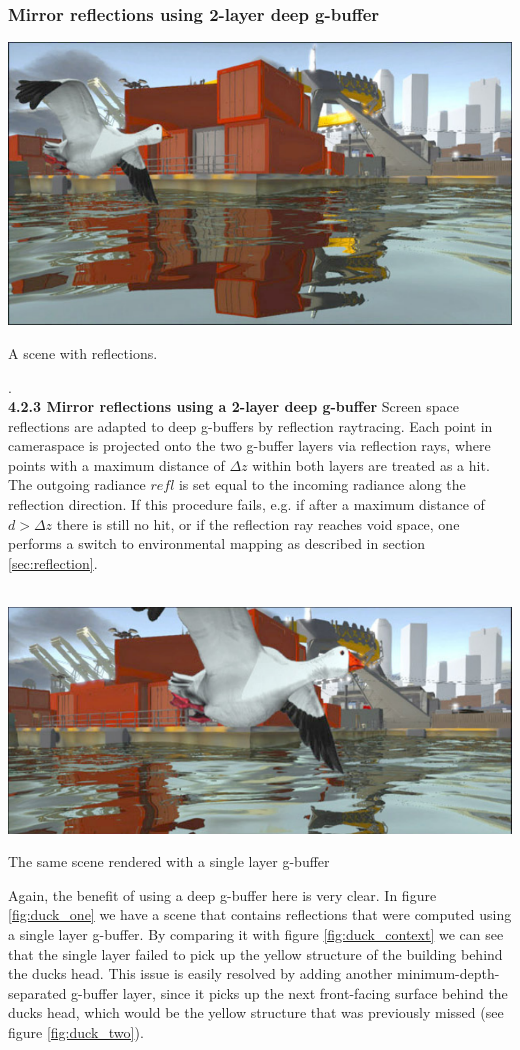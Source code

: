 \documentclass{ACGSeminar}
\begin{document}
	\subsubsection{Mirror reflections using 2-layer deep g-buffer}
		\begin{floatingfigure}[r]{.5\textwidth} %
			\includegraphics[width=.5\textwidth]{img/duck_context.png} %
			\caption{A scene with reflections.}%
			\label{fig:duck_context}%
		\end{floatingfigure} %
		. \\
		\textbf{4.2.3 \quad Mirror reflections using a 2-layer deep g-buffer} Screen space reflections are adapted to deep g-buffers by reflection raytracing. Each point in cameraspace is projected onto the two g-buffer layers via reflection rays, where points with a maximum distance of $\Delta z$ within both layers are treated as a hit. The outgoing radiance $refl$ is set equal to the incoming radiance along the reflection direction. If this procedure fails, e.g. if after a maximum distance of $d > \Delta z$ there is still no hit, or if the reflection ray reaches void space, one performs a switch to environmental mapping as described in section \ref{sec:reflection}. \\\\
		\begin{floatingfigure}[r]{.5\textwidth} %
			\includegraphics[width=.5\textwidth]{img/duck_one.png} %
			\caption{The same scene rendered with a single layer g-buffer}%
			\label{fig:duck_one}%
		\end{floatingfigure} %
		Again, the benefit of using a deep g-buffer here is very clear. In figure \ref{fig:duck_one} we have a scene that contains reflections that were computed using a single layer g-buffer. By comparing it with figure \ref{fig:duck_context} we can see that the single layer failed to pick up the yellow structure of the building behind the ducks head. This issue is easily resolved by adding another minimum-depth-separated g-buffer layer, since it picks up the next front-facing surface behind the ducks head, which would be the yellow structure that was previously missed (see figure \ref{fig:duck_two}).
\end{document}
